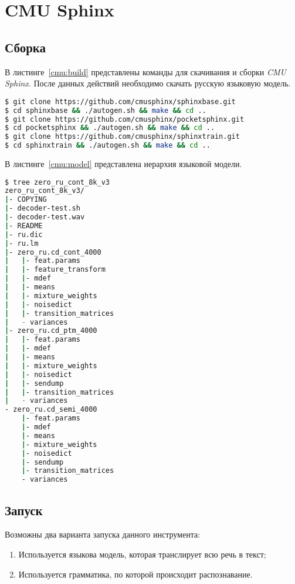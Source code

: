 \section{CMU Sphinx}
\subsection{Сборка}

В листинге~\ref{cmu:build} представлены команды для скачивания и сборки \textit{CMU Sphinx}.
После данных действий необходимо скачать русскую языковую модель.

\begin{lstlisting}[caption={Клонирование и сборка необходимых интсрументов},label={cmu:build},language=bash]
$ git clone https://github.com/cmusphinx/sphinxbase.git
$ cd sphinxbase && ./autogen.sh && make && cd ..
$ git clone https://github.com/cmusphinx/pocketsphinx.git
$ cd pocketsphinx && ./autogen.sh && make && cd ..
$ git clone https://github.com/cmusphinx/sphinxtrain.git
$ cd sphinxtrain && ./autogen.sh && make && cd ..
\end{lstlisting}

В листинге~\ref{cmu:model} представлена иерархия языковой модели.

\begin{lstlisting}[caption={Иерархия языковой модели},label={cmu:model},language=bash]
$ tree zero_ru_cont_8k_v3
zero_ru_cont_8k_v3/
|- COPYING
|- decoder-test.sh
|- decoder-test.wav
|- README
|- ru.dic
|- ru.lm
|- zero_ru.cd_cont_4000
|   |- feat.params
|   |- feature_transform
|   |- mdef
|   |- means
|   |- mixture_weights
|   |- noisedict
|   |- transition_matrices
|   - variances
|- zero_ru.cd_ptm_4000
|   |- feat.params
|   |- mdef
|   |- means
|   |- mixture_weights
|   |- noisedict
|   |- sendump
|   |- transition_matrices
|   - variances
- zero_ru.cd_semi_4000
    |- feat.params
    |- mdef
    |- means
    |- mixture_weights
    |- noisedict
    |- sendump
    |- transition_matrices
    - variances
\end{lstlisting}

\subsection{Запуск}
Возможны два варианта запуска данного инструмента:
\begin{enumerate}
    \item Используется языкова модель, которая транслирует всю речь в текст;
    \item Используется грамматика, по которой происходит распознавание.
\end{enumerate}

